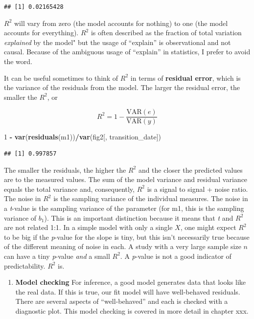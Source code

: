 \documentclass[]{book}
\newenvironment{Shaded}{\begin{snugshade}}{\end{snugshade}}
\newcommand{\DecValTok}[1]{\textcolor[rgb]{0.00,0.00,0.81}{#1}}
\newcommand{\KeywordTok}[1]{\textcolor[rgb]{0.13,0.29,0.53}{\textbf{#1}}}
\newcommand{\NormalTok}[1]{#1}
\newcommand{\OperatorTok}[1]{\textcolor[rgb]{0.81,0.36,0.00}{\textbf{#1}}}
\newcommand{\StringTok}[1]{\textcolor[rgb]{0.31,0.60,0.02}{#1}}
\providecommand{\tightlist}{%
  \setlength{\itemsep}{0pt}\setlength{\parskip}{0pt}}
\begin{document}
\begin{verbatim}
## [1] 0.02165428
\end{verbatim}

\(R^2\) will vary from zero (the model accounts for nothing) to one (the model accounts for everything). \(R^2\) is often described as the fraction of total variation \emph{explained} by the model" but the usage of ``explain'' is observational and not causal. Because of the ambiguous usage of ``explain'' in statistics, I prefer to avoid the word.

It can be useful sometimes to think of \(R^2\) in terms of \textbf{residual error}, which is the variance of the residuals from the model. The larger the residual error, the smaller the \(R^2\), or

\begin{equation}
R^2 = 1 - \frac{\mathrm{VAR}(e)}{\mathrm{VAR}(y)}
\end{equation}

\begin{Shaded}
\begin{Highlighting}[]
\DecValTok{1} \OperatorTok{-}\StringTok{ }\KeywordTok{var}\NormalTok{(}\KeywordTok{residuals}\NormalTok{(m1))}\OperatorTok{/}\KeywordTok{var}\NormalTok{(fig2[, transition_date])}
\end{Highlighting}
\end{Shaded}

\begin{verbatim}
## [1] 0.997857
\end{verbatim}

The smaller the residuals, the higher the \(R^2\) and the closer the predicted values are to the measured values. The sum of the model variance and residual variance equals the total variance and, consequently, \(R^2\) is a signal to signal + noise ratio. The noise in \(R^2\) is the sampling variance of the individual measures. The noise in a \emph{t}-value is the sampling variance of the parameter (for m1, this is the sampling variance of \(b_1\)). This is an important distinction because it means that \emph{t} and \(R^2\) are not related 1:1. In a simple model with only a single \(X\), one might expect \(R^2\) to be big if the \emph{p}-value for the slope is tiny, but this isn't necessarily true because of the different meaning of noise in each. A study with a very large sample size \(n\) can have a tiny \emph{p}-value \emph{and} a small \(R^2\). A \emph{p}-value is not a good indicator of predictability. \(R^2\) is.

\begin{enumerate}
\def\labelenumi{\arabic{enumi}.}
\setcounter{enumi}{1}
\tightlist
\item
  \textbf{Model checking} For inference, a good model generates data that looks like the real data. If this is true, our fit model will have well-behaved residuals. There are several aspects of ``well-behaved'' and each is checked with a diagnostic plot. This model checking is covered in more detail in chapter xxx.
\end{enumerate}
\end{document}
